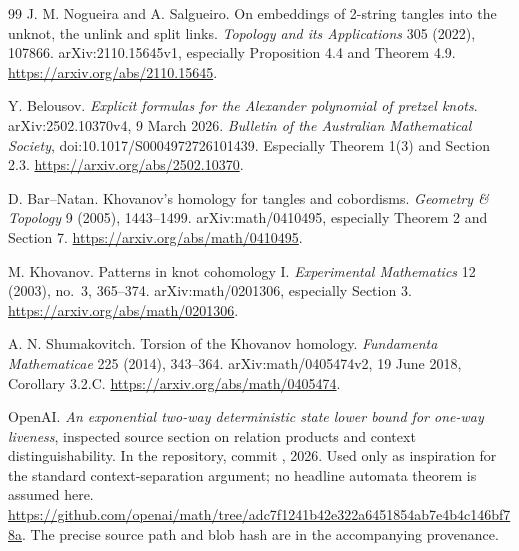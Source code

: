 \begin{thebibliography}{99}
J. M. Nogueira and A. Salgueiro.
On embeddings of 2-string tangles into the unknot, the unlink and split links.
\emph{Topology and its Applications} 305 (2022), 107866.
arXiv:2110.15645v1, especially Proposition 4.4 and Theorem 4.9.
\url{https://arxiv.org/abs/2110.15645}.

Y. Belousov.
\emph{Explicit formulas for the Alexander polynomial of pretzel knots}.
arXiv:2502.10370v4, 9 March 2026.
\emph{Bulletin of the Australian Mathematical Society},
doi:10.1017/S0004972726101439.
Especially Theorem 1(3) and Section 2.3.
\url{https://arxiv.org/abs/2502.10370}.

D. Bar--Natan.
Khovanov's homology for tangles and cobordisms.
\emph{Geometry \& Topology} 9 (2005), 1443--1499.
arXiv:math/0410495, especially Theorem 2 and Section 7.
\url{https://arxiv.org/abs/math/0410495}.

M. Khovanov.
Patterns in knot cohomology I.
\emph{Experimental Mathematics} 12 (2003), no.~3, 365--374.
arXiv:math/0201306, especially Section 3.
\url{https://arxiv.org/abs/math/0201306}.

A. N. Shumakovitch.
Torsion of the Khovanov homology.
\emph{Fundamenta Mathematicae} 225 (2014), 343--364.
arXiv:math/0405474v2, 19 June 2018, Corollary 3.2.C.
\url{https://arxiv.org/abs/math/0405474}.

OpenAI.
\emph{An exponential two-way deterministic state lower bound for one-way
liveness}, inspected source section on relation products and context
distinguishability. In the  repository, commit
, 2026.
Used only as inspiration for the standard context-separation argument;
no headline automata theorem is assumed here.
\url{https://github.com/openai/math/tree/adc7f1241b42e322a6451854ab7e4b4c146bf78a}.
The precise source path and blob hash are in the accompanying provenance.

\end{thebibliography}

